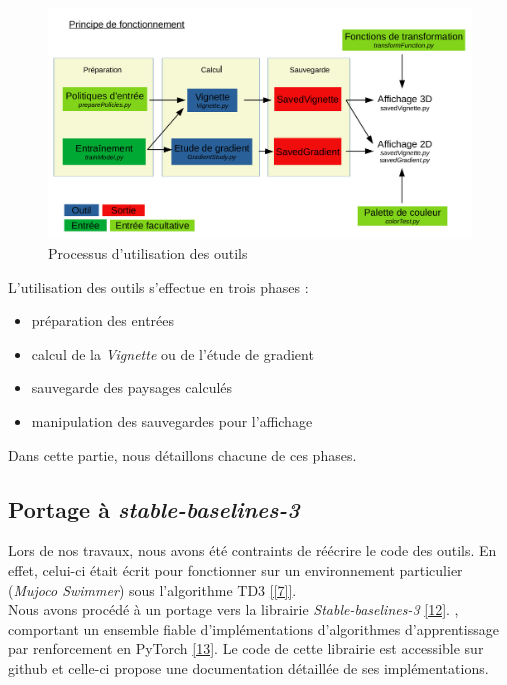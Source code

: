 \documentclass[12pt]{article}
\begin{document}
\begin{figure}[htp]
    \centering
    \includegraphics[width=18cm]{Images/Principe}
    \caption{Processus d'utilisation des outils}
    \label{fig:principe}
\end{figure}

\newpage
L'utilisation des outils s'effectue en trois phases : 
\begin{itemize}
	\setlength{\itemindent}{4em}
	\item préparation des entrées
	\item calcul de la \emph{Vignette} ou de l'étude de gradient
	\item sauvegarde des paysages calculés
	\item manipulation des sauvegardes pour l'affichage
\end{itemize}

Dans cette partie, nous détaillons chacune de ces phases.

\subsection*{Portage à \emph{stable-baselines-3}}

Lors de nos travaux, nous avons été contraints de réécrire le code des outils. En effet, celui-ci était écrit pour fonctionner sur un environnement particulier (\emph{Mujoco Swimmer}) sous l’algorithme TD3 \ref{[7]}. \\

Nous avons procédé à un portage vers la librairie \emph{Stable-baselines-3} \href{https://stable-baselines.readthedocs.io/en/master/ }{[12]}.
, comportant un ensemble fiable d’implémentations d’algorithmes d’apprentissage par renforcement en PyTorch \href{https://pytorch.org/  }{[13]}. Le code de cette librairie est accessible sur github et celle-ci propose une documentation détaillée de ses implémentations. \\
\end{document}

